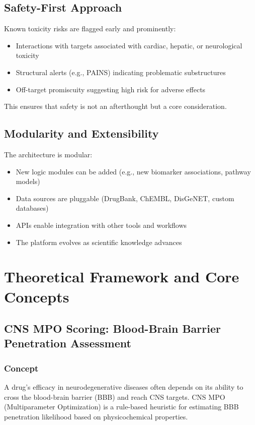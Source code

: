 \documentclass[12pt,a4paper]{article}
\begin{document}
\subsection{Safety-First Approach}
Known toxicity risks are flagged early and prominently:
\begin{itemize}
  \item Interactions with targets associated with cardiac, hepatic, or neurological toxicity
  \item Structural alerts (e.g., PAINS) indicating problematic substructures
  \item Off-target promiscuity suggesting high risk for adverse effects
\end{itemize}
This ensures that safety is not an afterthought but a core consideration.

\subsection{Modularity and Extensibility}
The architecture is modular:
\begin{itemize}
  \item New logic modules can be added (e.g., new biomarker associations, pathway models)
  \item Data sources are pluggable (DrugBank, ChEMBL, DisGeNET, custom databases)
  \item APIs enable integration with other tools and workflows
  \item The platform evolves as scientific knowledge advances
\end{itemize}

\section{Theoretical Framework and Core Concepts}
\label{sec:theory}

\subsection{CNS MPO Scoring: Blood-Brain Barrier Penetration Assessment}
\label{subsec:cns_mpo}

\subsubsection{Concept}
A drug's efficacy in neurodegenerative diseases often depends on its ability to cross the blood-brain barrier (BBB) and reach CNS targets. CNS MPO (Multiparameter Optimization) is a rule-based heuristic for estimating BBB penetration likelihood based on physicochemical properties.
\end{document}
